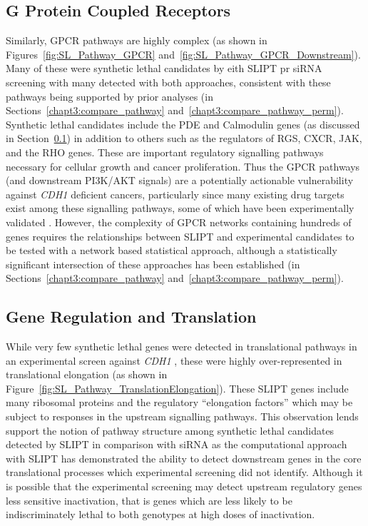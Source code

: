 \FloatBarrier

\subsection{G Protein Coupled Receptors}  \label{chapt4:SL_Genes_GPCR}

Similarly, \acrfull{GPCR} pathways are highly complex (as shown in Figures~\ref{fig:SL_Pathway_GPCR} and~\ref{fig:SL_Pathway_GPCR_Downstream}). Many of these were synthetic lethal candidates by eith \gls{SLIPT} pr \gls{siRNA} screening with many detected with both approaches, consistent with these pathways being supported by prior analyses (in Sections~\ref{chapt3:compare_pathway} and~\ref{chapt3:compare_pathway_perm}). Synthetic lethal candidates include the \gls{PDE} and Calmodulin genes (as discussed in Section~\ref{chapt4:SL_Genes_GPCR}) in addition to others such as the regulators of \gls{RGS}, \gls{CXCR}, \acrfull{JAK}, and the \gls{RHO} genes. These are important regulatory signalling pathways necessary for cellular growth and cancer proliferation. Thus the GPCR pathways (and downstream PI3K/AKT signals) are a potentially actionable vulnerability against \textit{CDH1} deficient cancers, particularly since many existing drug targets exist among these signalling pathways, some of which have been experimentally validated \citep{Telford2015, KellyHDGC}. However, the complexity of GPCR networks containing hundreds of genes requires the relationships between \gls{SLIPT} and experimental candidates to be tested with a network based statistical approach, although a statistically significant intersection of these approaches has been established (in Sections~\ref{chapt3:compare_pathway} and~\ref{chapt3:compare_pathway_perm}).



\FloatBarrier

\subsection{Gene Regulation and Translation}  \label{chapt4:SL_Genes_Translation}

While very few synthetic lethal genes were detected in translational pathways in an experimental screen against \textit{CDH1} \cite{Telford2015}, these were highly over-represented in translational elongation (as shown in Figure~\ref{fig:SL_Pathway_TranslationElongation}). These \gls{SLIPT} genes include many ribosomal proteins and the regulatory ``elongation factors'' which may be subject to responses in the upstream signalling pathways. This observation lends support the notion of pathway structure among synthetic lethal candidates detected by \gls{SLIPT} in comparison with \gls{siRNA} as the computational approach with \gls{SLIPT} has demonstrated the ability to detect downstream genes in the core translational processes which experimental screening did not identify. Although it is possible that the experimental screening may detect upstream regulatory genes less sensitive inactivation, that is genes which are less likely to be indiscriminately lethal to both genotypes at high doses of inactivation.

